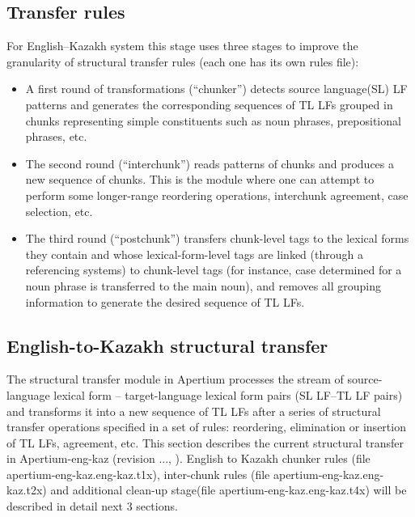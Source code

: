 \documentclass[11pt]{article}
\begin{document}
\begin{itemize}
\begin{table}
\begin{tabular}{|l|l|l|l|}
    \hline
 \end{tabular}

\end{table}

\subsection{Transfer rules}

For English–Kazakh system this stage uses three stages to improve the granularity of structural transfer rules (each one has its own rules file):
\begin{itemize}
\item A first round of transformations (“chunker”) detects source language(SL) LF patterns and generates the corresponding sequences of TL LFs grouped in chunks representing simple constituents such as noun phrases, prepositional phrases, etc. 
\item The second round (“interchunk”) reads patterns of chunks and produces a new sequence of chunks. This is the module where one can attempt to perform some longer-range reordering operations, interchunk agreement, case selection, etc. 
\item The third round (“postchunk”) transfers chunk-level tags to the lexical forms they contain and whose lexical-form-level tags are linked (through a referencing systems) to chunk-level tags (for instance, case determined for a noun phrase is transferred to the main noun), and removes all grouping information to generate the desired sequence of TL LFs.
\end{itemize}

\subsection{English-to-Kazakh structural transfer}

The structural transfer module in Apertium processes the stream of source-language lexical form – target-language lexical form pairs (SL LF–TL LF pairs) and transforms it into a new sequence of TL LFs after a series of structural transfer operations specified in a set of rules: reordering, elimination or insertion of TL LFs, agreement, etc. 
This section describes the current structural transfer in Apertium-eng-kaz (revision ..., ). English to Kazakh chunker rules (file apertium-eng-kaz.eng-kaz.t1x), inter-chunk rules (file apertium-eng-kaz.eng-kaz.t2x) and additional clean-up stage(file apertium-eng-kaz.eng-kaz.t4x) will be described in detail next 3 sections. 


\end{itemize}
\end{document}
